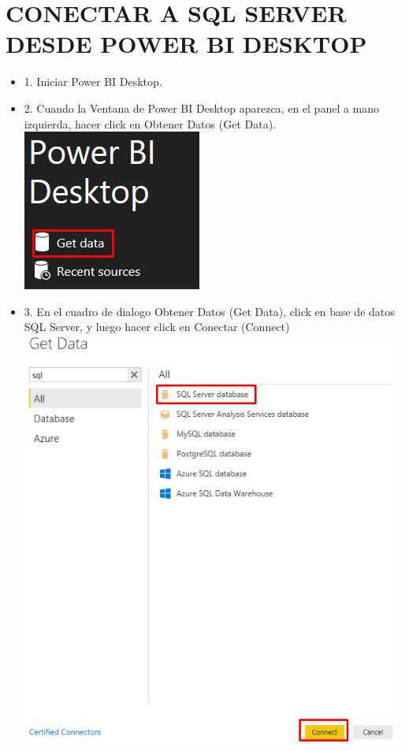 \section{ CONECTAR A SQL SERVER DESDE POWER BI DESKTOP} 

\begin{itemize}

\item 1. Iniciar Power BI Desktop.
\item 2. Cuando la Ventana de Power BI Desktop aparezca, en el panel a mano izquierda, hacer click en Obtener Datos (Get Data). \\
\includegraphics[scale=0.5]{./Imagenes/image001}
\item 3. En el cuadro de dialogo Obtener Datos (Get Data), click en base de datos SQL Server, y luego hacer click en Conectar (Connect) \\
\includegraphics[scale=0.5]{./Imagenes/image002}

\end{itemize}
